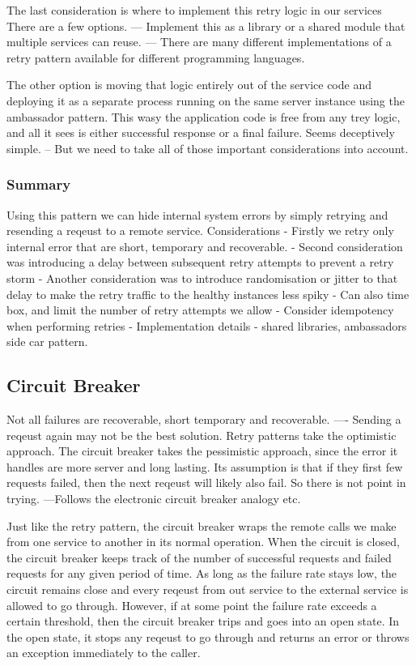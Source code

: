 The last consideration is where to implement this retry logic in our services
There are a few options.
--- Implement this as a library or a shared module that multiple services can reuse.
--- There are many different implementations of a retry pattern available for different programming languages.

The other option is moving that logic entirely out of the service code and deploying it as a separate process running on the same server instance using the ambassador pattern.
This wasy the application code is free from any trey logic, and all it sees is either successful response or a final failure.
Seems deceptively simple.
-- But we need to take all of those important considerations into account.

\subsubsection{Summary}
Using this pattern we can hide internal system errors by simply retrying and resending a reqeust to a remote service.
Considerations
- Firstly we retry only internal error that are short, temporary and recoverable.
- Second consideration was introducing a delay between subsequent retry attempts to prevent a retry storm
- Another consideration was to introduce randomisation or jitter to that delay to make the retry traffic to the healthy instances less spiky
- Can also time box, and limit the number of retry attempts we allow
- Consider idempotency when performing retries
- Implementation details - shared libraries, ambassadors side car pattern.

\subsection{Circuit Breaker}
Not all failures are recoverable, short temporary and recoverable.
---- Sending a reqeust again may not be the best solution.
Retry patterns take the optimistic approach.
The circuit breaker takes the pessimistic approach, since the error it handles are more server and long lasting.
Its assumption is that if they first few requests failed, then the next reqeust will likely also fail.
So there is not point in trying.
---Follows the electronic circuit breaker analogy etc.

Just like the retry pattern, the circuit breaker wraps the remote calls we make from one service to another in its normal operation.
When the circuit is closed, the circuit breaker keeps track of the number of successful requests and failed requests for any given period of time.
As long as the failure rate stays low, the circuit remains close and every reqeust from out service to the external service is allowed to go through.
However, if at some point the failure rate exceeds a certain threshold, then the circuit breaker trips and goes into an open state.
In the open state, it stops any reqeust to go through and returns an error or throws an exception immediately to the caller.

